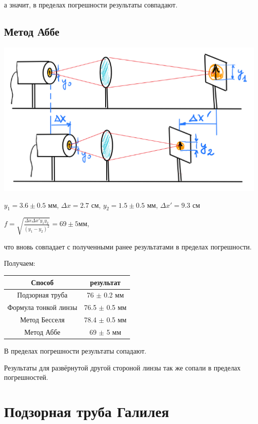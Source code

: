 \documentclass{article}
\begin{document}
а значит, в пределах погрешности результаты совпадают.

\subsection{Метод Аббе}

\includegraphics[width=0.5\linewidth]{Снимок экрана от 2024-05-09 19-16-42.png}

$y_1 = 3.6 \pm 0.5$ мм, $\Delta x = 2.7$ см, $y_2 = 1.5 \pm 0.5$ мм, $\Delta x' = 9.3$ см

\begin{center}
    $f = \sqrt{\frac{\Delta x \Delta x' y_1 y_2}{(y_1 - y_2)^2}} = 69 \pm 5 $мм,
\end{center}

что вновь совпадает с полученными ранее результатами в пределах погрешности. 

Получаем:

\begin{tabular}{|c|c|}

\hline
    Способ & результат  \\
    \hline
    Подзорная труба & 76 $\pm$ 0.2 мм \\

         \hline
    Формула тонкой линзы& 76.5 $\pm$ 0.5 мм \\

   \hline

   Метод Бесселя & 78.4 $\pm$ 0.5 мм \\

   \hline

   Метод Аббе & 69 $\pm$ 5 мм \\

   \hline
\end{tabular}

В пределах погрешности результаты сопадают.

Результаты для развёрнутой другой стороной линзы так же сопали в пределах погрешностей.

\section{Подзорная труба Галилея}
\end{document}
